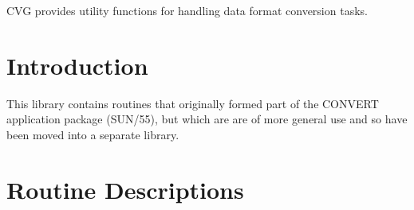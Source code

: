 
CVG provides utility functions for handling data format conversion tasks.

 \newpage
 \begin{latexonly}
   \setlength{\parskip}{0mm}
   \latexonlytoc
   \setlength{\parskip}{\medskipamount}
   \markright{\stardocname}
 \end{latexonly}
\newpage
\renewcommand{\thepage}{\arabic{page}}
\setcounter{page}{1}

\section {Introduction}

This library contains routines that originally formed part of the CONVERT
application package (SUN/55), but which are are of more general use and so have
been moved into a separate library.

\appendix
\section{\label{APP:SPEC}Routine Descriptions}

